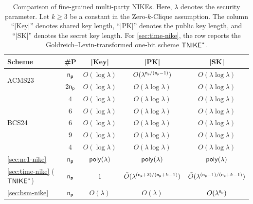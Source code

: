 \begin{table}[h]
\centering
\scriptsize
\setlength{\tabcolsep}{4pt}
\begin{tabular}{|l|c|c|c|c|}
\hline
\textbf{Scheme} 
& \textbf{\#P} 
& \textbf{|Key|}
& \textbf{|PK|}
& \textbf{|SK|}\\
\hline

\multirow{2}{*}{ACMS23\cite{EC:ACMS23}}
& $\mathsf{n_p}$
& $O(\log\lambda)$ 
& $O(\lambda^{\mathsf{n_p}/(\mathsf{n_p}-1)})$
& $O(\lambda\log\lambda)$\\
\cline{2-5}

& $2\mathsf{n_p}$
& $O(\log\lambda)$ 
& $O(\lambda\log\lambda)$
& $O(\lambda\log\lambda)$\\
\hline

\multirow{5}{*}{BCS24\cite{C:BauCouSad24}}
& $4$
& $O(\log\lambda)$ 
& $O(\lambda\log\lambda)$
& $O(\lambda\log\lambda)$\\ 
\cline{2-5}

& $6$
& $O(\log\lambda)$ 
& $O(\lambda\log\lambda)$
& $O(\lambda\log\lambda)$\\ 
\cline{2-5}

& $6$
& $O(\log\lambda)$ 
& $O(\lambda\log\lambda)$
& $O(\lambda\log\lambda)$\\ 
\cline{2-5}

& $9$
& $O(\log\lambda)$ 
& $O(\lambda\log\lambda)$
& $O(\lambda\log\lambda)$\\ 
\cline{2-5}

& $4$
& $O(\log\lambda)$ 
& $O(\lambda\log\lambda)$
& $O(\lambda\log\lambda)$\\ 
\hline

\cref{sec:nc1-nike} 
& $\mathsf{n_p}$
& $\mathsf{poly}(\lambda)$ 
& $\mathsf{poly}(\lambda)$
& $\mathsf{poly}(\lambda)$\\ 
\hline

\cref{sec:time-nike} ($\mathsf{TNIKE}^*$)
& $\mathsf{n_p}$
& $1$
& $\tilde{O}(\lambda^{(\mathsf{n_p}+2)/(\mathsf{n_p}+k-1)})$
& $\tilde{O}(\lambda^{(\mathsf{n_p}-1)/(\mathsf{n_p}+k-1)})$\\
\hline

\cref{sec:bsm-nike} 
& $\mathsf{n_p}$
& $O(\lambda)$ 
& $O(\lambda)$
& $O(\lambda^{\mathsf{n_p}})$\\ 
\hline

\end{tabular}
\caption{Comparison of fine-grained multi-party NIKEs. 
Here, $\lambda$ denotes the security parameter. 
Let $k \ge 3$ be a constant in the Zero-$k$-Clique assumption. 
The column 
``|Key|'' denotes shared key length, 
``|PK|'' denotes the public key length,
and ``|SK|'' denotes the secret key length. For \cref{sec:time-nike}, the row reports the Goldreich--Levin-transformed one-bit scheme $\mathsf{TNIKE}^*$.}
\label{fig:comparison-muke2}
\end{table}
